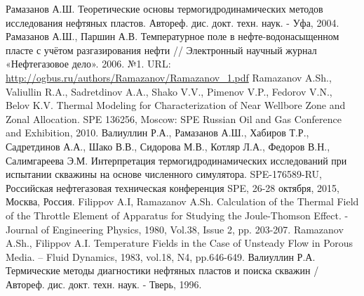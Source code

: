 \begin{thebibliography}{99}
 Рамазанов А.Ш. Теоретические основы термогидродинамических методов исследования нефтяных пластов. Автореф. дис. докт. техн. наук. - Уфа, 2004.
 Рамазанов А.Ш., Паршин А.В. Температурное поле в нефте-водонасыщенном пласте с учётом разгазирования нефти // Электронный научный журнал «Нефтегазовое дело». 2006. №1. URL: \url{http://ogbus.ru/authors/Ramazanov/Ramazanov_1.pdf}
 Ramazanov A.Sh., Valiullin R.A., Sadretdinov A.A., Shako V.V., Pimenov V.P., Fedorov V.N., Belov K.V. Thermal Modeling for Characterization of Near Wellbore Zone and Zonal Allocation. SPE 136256, Moscow: SPE Russian Oil and Gas Conference and Exhibition, 2010.
 Валиуллин Р.А., Рамазанов А.Ш., Хабиров Т.Р., Садретдинов А.А., Шако В.В., Сидорова М.В., Котляр Л.А., Федоров В.Н., Салимгареева Э.М. Интерпретация термогидродинамических  исследований при испытании скважины на основе численного симулятора. SPE-176589-RU, Российская нефтегазовая техническая конференция SPE, 26-28 октября, 2015, Москва, Россия.
 Filippov A.I, Ramazanov A.Sh. Calculation of the Thermal Field of the Throttle Element of Apparatus for Studying the Joule-Thomson Effect. - Journal of Engineering Physics, 1980, Vol.38, Issue 2, pp. 203-207.
 Ramazanov A.Sh., Filippov A.I. Temperature Fields in the Case of Unsteady Flow in Porous Media. – Fluid Dynamics, 1983,  vol.18, N4, pp.646-649. 
 Валиуллин Р.А. Термические методы диагностики нефтяных пластов и поиска скважин /   Автореф. дис. докт. техн. наук. - Тверь, 1996.


\end{thebibliography}
